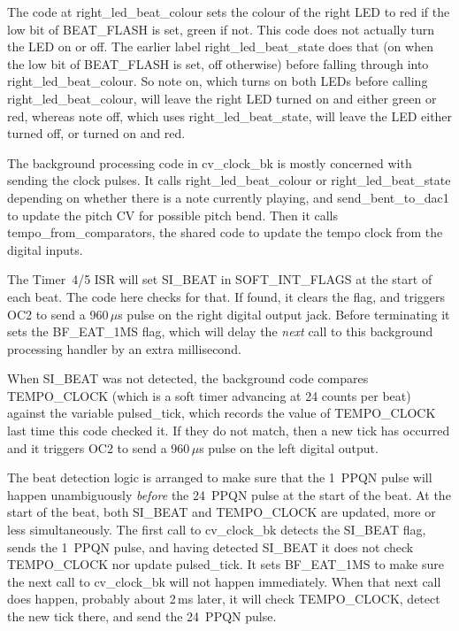 The code at right\_led\_beat\_colour sets the
colour of the right LED to red if the low bit of BEAT\_FLASH is set, green
if not.  This code does not actually turn the LED on or off.  The earlier
label right\_led\_beat\_state does that (on when the low bit of BEAT\_FLASH
is set, off otherwise) before falling through into right\_led\_beat\_colour. 
So note on, which turns on both LEDs before calling
right\_led\_beat\_colour, will leave the right LED turned on and either
green or red, whereas note off, which uses right\_led\_beat\_state, will
leave the LED either turned off, or turned on and red.

The background processing code in cv\_clock\_bk is mostly concerned with
sending the clock pulses.  It calls right\_led\_beat\_colour or
right\_led\_beat\_state depending on whether there is a note currently
playing, and send\_bent\_to\_dac1 to update the pitch CV for possible pitch
bend.  Then it calls tempo\_from\_comparators, the shared code to update the
tempo clock from the digital inputs.

The Timer~4/5 ISR will set SI\_BEAT in SOFT\_INT\_FLAGS at the start of
each beat.  The code here checks for that.  If found, it clears the flag,
and triggers OC2 to send a 960\,$\mu$s pulse on the right digital output
jack.  Before terminating it sets the BF\_EAT\_1MS flag, which will delay
the \emph{next} call to this background processing handler by an extra
millisecond.

When SI\_BEAT was not detected, the background code compares TEMPO\_CLOCK
(which is a soft timer advancing at 24 counts per beat) against the variable
pulsed\_tick, which records the value of TEMPO\_CLOCK last time this code
checked it.  If they do not match, then a new tick has occurred and it
triggers OC2 to send a 960\,$\mu$s pulse on the left digital output.

The beat detection logic is arranged to make sure that the 1~PPQN pulse will
happen unambiguously \emph{before} the 24~PPQN pulse at the start of the
beat.  At the start of the beat, both SI\_BEAT and TEMPO\_CLOCK are updated,
more or less simultaneously.  The first call to cv\_clock\_bk detects the
SI\_BEAT flag, sends the 1~PPQN pulse, and having detected SI\_BEAT it does
not check TEMPO\_CLOCK nor update pulsed\_tick.  It sets BF\_EAT\_1MS to
make sure the next call to cv\_clock\_bk will not happen immediately.  When
that next call does happen, probably about 2\,ms later, it will check
TEMPO\_CLOCK, detect the new tick there, and send the 24~PPQN pulse.

